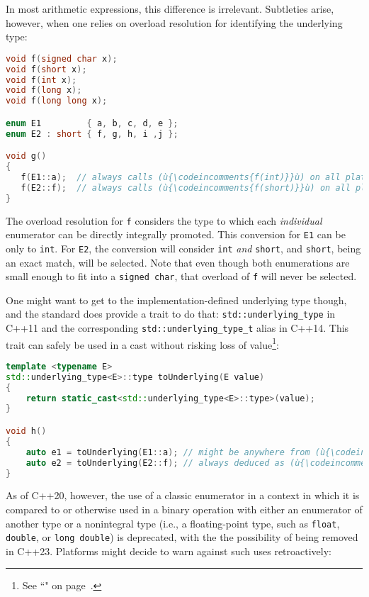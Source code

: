 In most arithmetic expressions, this difference is irrelevant.
Subtleties arise, however, when one relies on overload resolution for
identifying the underlying type:

\begin{lstlisting}[language=C++]
void f(signed char x);
void f(short x);
void f(int x);
void f(long x);
void f(long long x);

enum E1         { a, b, c, d, e };
enum E2 : short { f, g, h, i ,j };

void g()
{
   f(E1::a);  // always calls (ù{\codeincomments{f(int)}}ù) on all platforms
   f(E2::f);  // always calls (ù{\codeincomments{f(short)}}ù) on all platforms
}
\end{lstlisting}

\noindent The overload resolution for \texttt{f} considers the type to which each
\emph{individual} enumerator can be directly integrally promoted. This
conversion for \texttt{E1} can be only to \texttt{int}. For \texttt{E2},
the conversion will consider \texttt{int} \emph{and} \texttt{short}, and
\texttt{short}, being an exact match, will be selected. Note that even
though both enumerations are small enough to fit into a
\texttt{signed}~\texttt{char}, that overload of \texttt{f} will never be
selected.

One might want to get to the implementation-defined underlying type
though, and the standard does provide a trait to do that:
\texttt{std::underlying\_type} in C++11 and the corresponding
\texttt{std::underlying\_type\_t} alias in C++14. This trait can safely
be used in a cast without risking loss of value{\cprotect\footnote{See
  ``" on page~\pageref{auto}.}}:

\begin{lstlisting}[language=C++]
template <typename E>
std::underlying_type<E>::type toUnderlying(E value)
{
    return static_cast<std::underlying_type<E>::type>(value);
}

void h()
{
    auto e1 = toUnderlying(E1::a); // might be anywhere from (ù{\codeincomments{signed char}}ù) to (ù{\codeincomments{int}}ù)
    auto e2 = toUnderlying(E2::f); // always deduced as (ù{\codeincomments{short}}ù)
}
\end{lstlisting}

\noindent As of C++20, however, the use of a classic enumerator in a context in
which it is compared to or otherwise used in a binary operation with
either an enumerator of another type or a nonintegral type (i.e., a
floating-point type, such as \texttt{float}, \texttt{double}, or
\texttt{long}~\texttt{double}) is deprecated, with the the possibility
of being removed in C++23. Platforms might decide to warn against such
uses retroactively:

